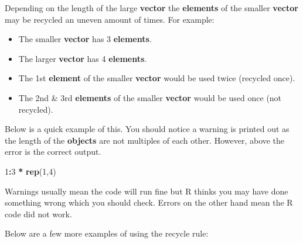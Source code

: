 \documentclass[]{book}
\newenvironment{Shaded}{\begin{snugshade}}{\end{snugshade}}
\newcommand{\KeywordTok}[1]{\textcolor[rgb]{0.13,0.29,0.53}{\textbf{#1}}}
\newcommand{\DecValTok}[1]{\textcolor[rgb]{0.00,0.00,0.81}{#1}}
\newcommand{\StringTok}[1]{\textcolor[rgb]{0.31,0.60,0.02}{#1}}
\newcommand{\OperatorTok}[1]{\textcolor[rgb]{0.81,0.36,0.00}{\textbf{#1}}}
\newcommand{\NormalTok}[1]{#1}
\providecommand{\tightlist}{%
  \setlength{\itemsep}{0pt}\setlength{\parskip}{0pt}}
\begin{document}
Depending on the length of the large \textbf{vector} the
\textbf{elements} of the smaller \textbf{vector} may be recycled an
uneven amount of times. For example:

\begin{itemize}
\tightlist
\item
  The smaller \textbf{vector} has 3 \textbf{elements}.
\item
  The larger \textbf{vector} has 4 \textbf{elements}.
\item
  The 1st \textbf{element} of the smaller \textbf{vector} would be used
  twice (recycled once).
\item
  The 2nd \& 3rd \textbf{elements} of the smaller \textbf{vector} would
  be used once (not recycled).
\end{itemize}

Below is a quick example of this. You should notice a warning is printed
out as the length of the \textbf{objects} are not multiples of each
other. However, above the error is the correct output.

\begin{Shaded}
\begin{Highlighting}[]
\DecValTok{1}\OperatorTok{:}\DecValTok{3} \OperatorTok{*}\StringTok{ }\KeywordTok{rep}\NormalTok{(}\DecValTok{1}\NormalTok{,}\DecValTok{4}\NormalTok{)}
\end{Highlighting}
\end{Shaded}

Warnings usually mean the code will run fine but R thinks you may have
done something wrong which you should check. Errors on the other hand
mean the R code did not work.

Below are a few more examples of using the recycle rule:
\end{document}
